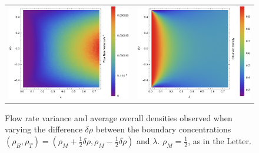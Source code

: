 \documentclass[
reprint,
 amsmath,amssymb,
 aps,
 prl,
]{revtex4-1}
\begin{document}
\begin{figure}[h!]
\vspace{1em}
\caption{\label{fig:fullConstDens} Flow rate variance and average overall densities observed when varying the difference $\delta\rho$ between the boundary concentrations
$(\rho_B, \rho_T) = (\rho_M + \frac{1}{2} \delta\rho, \rho_M - \frac{1}{2} \delta\rho)$ and $\lambda$. $\rho_M=\frac{1}{2}$, as in the Letter.}
\begin{center}
 \begin{tabular}{c|c}
    \includegraphics[width=0.5\linewidth]{../tex-src/images/constDens/newVar} & \includegraphics[width=0.5\linewidth]{../tex-src/images/constDens/newDens} \\
    \end{tabular}
\end{center}
    \vspace{0em}
\end{figure}
\end{document}
